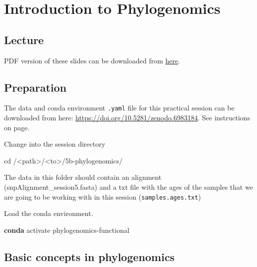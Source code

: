 \documentclass[
  letterpaper,
]{book}
\newenvironment{Shaded}{}{}
\newcommand{\BuiltInTok}[1]{\textcolor[rgb]{0.84,0.23,0.29}{#1}}
\newcommand{\ExtensionTok}[1]{\textcolor[rgb]{0.84,0.23,0.29}{\textbf{#1}}}
\newcommand{\NormalTok}[1]{\textcolor[rgb]{0.14,0.16,0.18}{#1}}
\newcommand{\OperatorTok}[1]{\textcolor[rgb]{0.14,0.16,0.18}{#1}}
\begin{document}
\hypertarget{introduction-to-phylogenomics}{%
\chapter{Introduction to
Phylogenomics}\label{introduction-to-phylogenomics}}

\hypertarget{lecture-13}{%
\section{Lecture}\label{lecture-13}}

PDF version of these slides can be downloaded from
\href{assets/images/chapters/phylogenomics/SPAAM\%20Summer\%20School\%202022\%20-\%205B\%20-\%20Phylogenomics.pdf}{here}.

\hypertarget{preparation-2}{%
\section{Preparation}\label{preparation-2}}

The data and conda environment \texttt{.yaml} file for this practical
session can be downloaded from here:
\url{https://doi.org/10.5281/zenodo.6983184}. See instructions on page.

Change into the session directory

\begin{Shaded}
\begin{Highlighting}[]
\BuiltInTok{cd}\NormalTok{ /}\OperatorTok{\textless{}}\NormalTok{path}\OperatorTok{\textgreater{}}\NormalTok{/}\OperatorTok{\textless{}}\NormalTok{to}\OperatorTok{\textgreater{}}\NormalTok{/5b{-}phylogenomics/}
\end{Highlighting}
\end{Shaded}

The data in this folder should contain an alignment
(snpAlignment\_session5.fasta) and a txt file with the ages of the
samples that we are going to be working with in this session
(\texttt{samples.ages.txt})

Load the conda environment.

\begin{Shaded}
\begin{Highlighting}[]
\ExtensionTok{conda}\NormalTok{ activate phylogenomics{-}functional}
\end{Highlighting}
\end{Shaded}

\hypertarget{basic-concepts-in-phylogenomics}{%
\section{Basic concepts in
phylogenomics}\label{basic-concepts-in-phylogenomics}}
\end{document}
